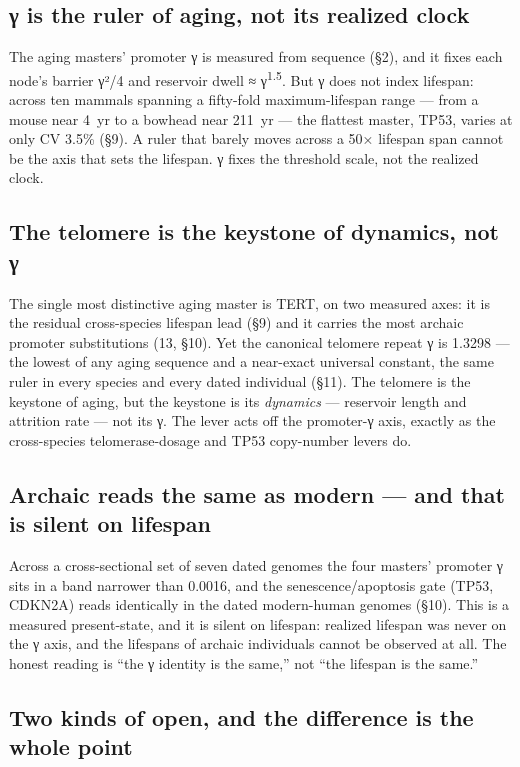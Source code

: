 \documentclass[11pt]{article}
\begin{document}
\subsection*{γ is the ruler of aging, not its realized clock}

The aging masters' promoter γ is measured from sequence (§2), and it fixes each node's barrier γ²/4 and reservoir dwell ≈ γ\textsuperscript{1.5}. But γ does not index lifespan: across ten mammals spanning a fifty-fold maximum-lifespan range — from a mouse near 4 yr to a bowhead near 211 yr — the flattest master, TP53, varies at only CV 3.5\% (§9). A ruler that barely moves across a 50× lifespan span cannot be the axis that sets the lifespan. γ fixes the threshold scale, not the realized clock.

\subsection*{The telomere is the keystone of dynamics, not γ}

The single most distinctive aging master is TERT, on two measured axes: it is the residual cross-species lifespan lead (§9) and it carries the most archaic promoter substitutions (13, §10). Yet the canonical telomere repeat γ is 1.3298 — the lowest of any aging sequence and a near-exact universal constant, the same ruler in every species and every dated individual (§11). The telomere is the keystone of aging, but the keystone is its \textit{dynamics} — reservoir length and attrition rate — not its γ. The lever acts off the promoter-γ axis, exactly as the cross-species telomerase-dosage and TP53 copy-number levers do.

\subsection*{Archaic reads the same as modern — and that is silent on lifespan}

Across a cross-sectional set of seven dated genomes the four masters' promoter γ sits in a band narrower than 0.0016, and the senescence/apoptosis gate (TP53, CDKN2A) reads identically in the dated modern-human genomes (§10). This is a measured present-state, and it is silent on lifespan: realized lifespan was never on the γ axis, and the lifespans of archaic individuals cannot be observed at all. The honest reading is “the γ identity is the same,” not “the lifespan is the same.”

\subsection*{Two kinds of open, and the difference is the whole point}
\end{document}
